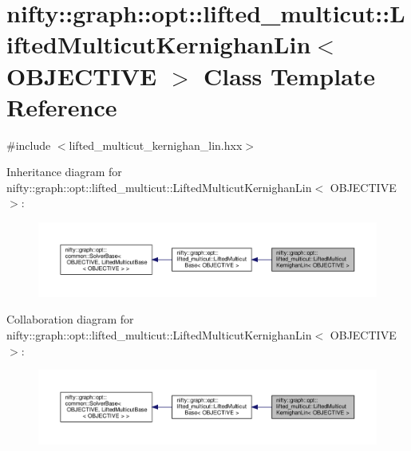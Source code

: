 \hypertarget{classnifty_1_1graph_1_1opt_1_1lifted__multicut_1_1LiftedMulticutKernighanLin}{}\section{nifty\+:\+:graph\+:\+:opt\+:\+:lifted\+\_\+multicut\+:\+:Lifted\+Multicut\+Kernighan\+Lin$<$ O\+B\+J\+E\+C\+T\+I\+VE $>$ Class Template Reference}
\label{classnifty_1_1graph_1_1opt_1_1lifted__multicut_1_1LiftedMulticutKernighanLin}


{\ttfamily \#include $<$lifted\+\_\+multicut\+\_\+kernighan\+\_\+lin.\+hxx$>$}



Inheritance diagram for nifty\+:\+:graph\+:\+:opt\+:\+:lifted\+\_\+multicut\+:\+:Lifted\+Multicut\+Kernighan\+Lin$<$ O\+B\+J\+E\+C\+T\+I\+VE $>$\+:
\nopagebreak
\begin{figure}[H]
\begin{center}
\leavevmode
\includegraphics[width=350pt]{classnifty_1_1graph_1_1opt_1_1lifted__multicut_1_1LiftedMulticutKernighanLin__inherit__graph}
\end{center}
\end{figure}


Collaboration diagram for nifty\+:\+:graph\+:\+:opt\+:\+:lifted\+\_\+multicut\+:\+:Lifted\+Multicut\+Kernighan\+Lin$<$ O\+B\+J\+E\+C\+T\+I\+VE $>$\+:
\nopagebreak
\begin{figure}[H]
\begin{center}
\leavevmode
\includegraphics[width=350pt]{classnifty_1_1graph_1_1opt_1_1lifted__multicut_1_1LiftedMulticutKernighanLin__coll__graph}
\end{center}
\end{figure}

